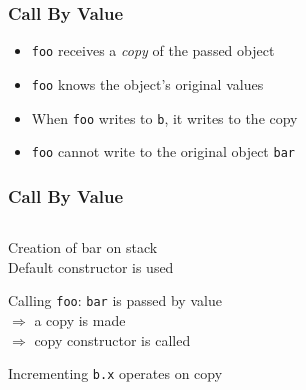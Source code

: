\begin{frame}
  \frametitle{Call By Value}
  \begin{itemize}
    \item {\tt foo} receives a \emph{copy} of the passed object
    \item {\tt foo} knows the object's original values
    \item When {\tt foo} writes to {\tt b}, it writes to the copy
    \item {\tt foo} cannot write to the original object {\tt bar}
  \end{itemize}
\end{frame}

\begin{frame}
  \frametitle{Call By Value}
  \begin{center}
    \begin{columns}
      \column{4cm}
      \column{6cm}
    \end{columns}
  \end{center}
  \vskip2mm
  \begin{overprint}
    \begin{center}
      Creation of bar on stack \\
      Default constructor is used
    \end{center}

    \begin{center}
      Calling {\tt foo}: {\tt bar} is passed by value \\
      $\Rightarrow$ a copy is made \\
      $\Rightarrow$ copy constructor is called
    \end{center}

    \begin{center}
      Incrementing {\tt b.x} operates on copy
    \end{center}


\end{overprint}
\end{frame}
